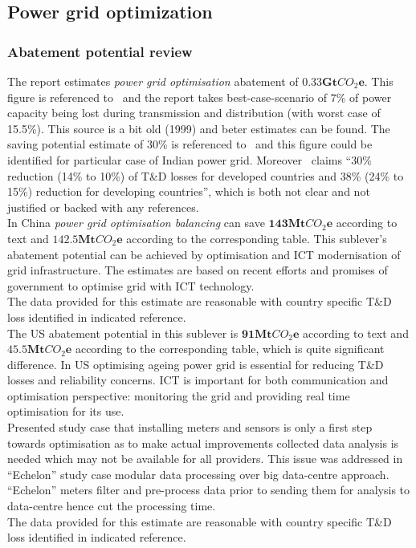 \documentclass[11pt, twocolumn]{article}
\begin{document}
\subsection{Power grid optimization}
\subsubsection{Abatement potential review}
The report estimates \emph{power grid optimisation} abatement of $\mathbf{0.33Gt}CO_2\mathbf{e}$. This figure is referenced to~\citep{teri:td} and the report takes best-case-scenario of 7\% of power capacity being lost during transmission and distribution (with worst case of 15.5\%). This source is a bit old (1999) and beter estimates can be found. The saving potential estimate of 30\% is referenced to~\citep{webb2008smart} and this figure could be identified for particular case of Indian power grid. Moreover~\citep{webb2008smart} claims ``30\% reduction (14\% to 10\%) of T\&D losses for developed countries and 38\% (24\% to 15\%) reduction for developing countries'', which is both not clear and not justified or backed with any references.\\

In China \emph{power grid optimisation balancing} can save $\mathbf{143} \mathbf{Mt}CO_2\mathbf{e}$ according to text and $\mathbf{142.5} \mathbf{Mt}CO_2\mathbf{e}$ according to the corresponding table. This sublever's abatement potential can be achieved by optimisation and ICT modernisation of grid infrastructure. The estimates are based on recent efforts and promises of government to optimise grid with ICT technology.\\
The data provided for this estimate are reasonable with country specific T\&D loss identified in indicated reference.\\

The US abatement potential in this sublever is $\mathbf{91} \mathbf{Mt}CO_2\mathbf{e}$ according to text and $\mathbf{45.5} \mathbf{Mt}CO_2\mathbf{e}$ according to the corresponding table, which is quite significant difference. In US optimising ageing power grid is essential for reducing T\&D losses and reliability concerns. ICT is important for both communication and optimisation perspective: monitoring the grid and providing real time optimisation for its use.\\
Presented study case that installing meters and sensors is only a first step towards optimisation as to make actual improvements collected data analysis is needed which may not be available for all providers. This issue was addressed in ``Echelon'' study case modular data processing over big data-centre approach. ``Echelon'' meters filter and pre-process data prior to sending them for analysis to data-centre hence cut the processing time.\\
The data provided for this estimate are reasonable with country specific T\&D loss identified in indicated reference.\\
\end{document}
